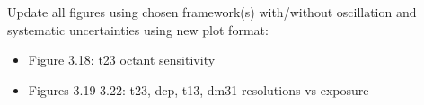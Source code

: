  Update all figures using chosen framework(s) with/without oscillation and systematic uncertainties using new plot format:
\begin{itemize}
	\item {} Figure 3.18: t23 octant sensitivity
	\item {} Figures 3.19-3.22: t23, dcp, t13, dm31 resolutions vs exposure
\end{itemize}
